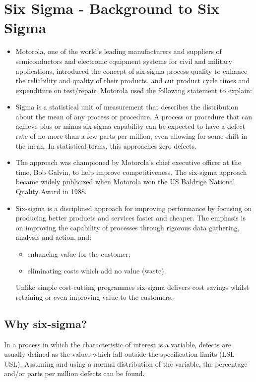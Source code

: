 \documentclass[MASTER-SPC.tex]{subfiles}
\begin{document}
\section{Six Sigma - Background to Six Sigma}
\begin{itemize}

\item Motorola, one of the world’s leading manufacturers and suppliers of
semiconductors and electronic equipment systems for civil and military
applications, introduced the concept of six-sigma process quality to enhance the reliability and quality of their products, and cut product cycle times and expenditure on test/repair. Motorola used the following statement to explain:

\item Sigma is a statistical unit of measurement that describes the distribution about the mean of any process or procedure. A process or procedure that can achieve plus or minus six-sigma capability can be expected to have a defect rate of no more than a few parts per million, even allowing for some shift in the mean. In statistical terms, this approaches zero defects.

\item The approach was championed by Motorola’s chief executive officer at the
time, Bob Galvin, to help improve competitiveness. The six-sigma approach became widely publicized when Motorola won the US Baldrige National Quality Award in 1988.

\item Six-sigma is a disciplined approach for improving performance by focusing
on producing better products and services faster and cheaper. The emphasis is on improving the capability of processes through rigorous data gathering, analysis and action, and:
\begin{itemize}
	\item 	enhancing value for the customer;
	\item 	eliminating costs which add no value (waste).
\end{itemize}
Unlike simple cost-cutting programmes six-sigma delivers cost savings
whilst retaining or even improving value to the customers.

\end{itemize}
\subsection{	Why six-sigma?}
	In a process in which the characteristic of interest is a variable, defects are usually defined as the values which fall outside the specification limits (LSL–USL). Assuming and using a normal distribution of the variable, the
	percentage and/or parts per million defects can be found. 
	
\end{document}
